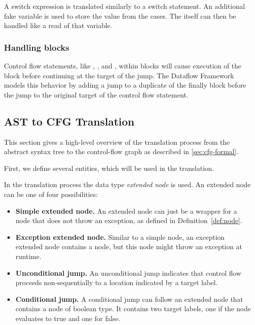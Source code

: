A switch expression is translated similarly to a switch statement.
An additional fake variable  is used to store the value
from the cases. The  itself can then be
handled like a read of that variable.


\subsubsection{Handling  blocks}
\label{sec:try-finally}

Control flow statements, like , , and ,
within  blocks will cause execution of the  block before
continuing at the target of the jump. The Dataflow Framework models this
behavior by adding a jump to a duplicate of the finally block before the
jump to the original target of the control flow statement.


\subsection{AST to CFG Translation}
\label{sec:ast_to_cfg_translation}

This section gives a high-level overview of the translation process
from the abstract syntax tree to the control-flow graph as described
in \autoref{sec:cfg-formal}.

First, we define several entities, which will be used in the translation.

\begin{definition}
    In the translation process the data type \emph{extended node} is used.
    An extended node can be one of four possibilities:
    \begin{itemize}
        \item \textbf{Simple extended node.} An extended node can just be a
          wrapper for a node that does not throw an exception,
          as defined in Definition~\ref{def:node}.
        \item \textbf{Exception extended node.} Similar to a simple
          node, an exception extended node contains a node, but this
          node might throw an exception at runtime.
        \item \textbf{Unconditional jump.} An unconditional jump
          indicates that control flow proceeds non-sequentially to a
          location indicated by a target label.
        \item \textbf{Conditional jump.} A conditional jump can follow
          an extended node that contains a node of boolean type. It
          contains two target labels, one if the node evaluates to
          true and one for false.
    \end{itemize}
\end{definition}


